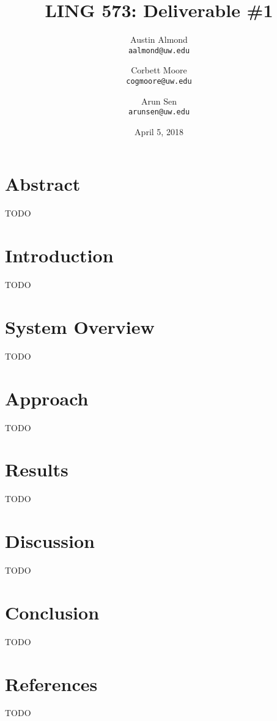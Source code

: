 \documentclass{article}
\begin{document}
	\title{LING 573: Deliverable \#1}
	\author{
		Austin Almond\\
		\texttt{aalmond@uw.edu}
		\and
		Corbett Moore\\
		\texttt{cogmoore@uw.edu}
		\and
		Arun Sen\\
		\texttt{arunsen@uw.edu}
	}
	\date{April 5, 2018}
	\maketitle

	\section*{Abstract}

	TODO

	\section*{Introduction}

	TODO

	\section*{System Overview}

	TODO

	\section*{Approach}

	TODO

	\section*{Results}

	TODO

	\section*{Discussion}

	TODO

	\section*{Conclusion}

	TODO

	\section*{References}

	TODO
\end{document}
